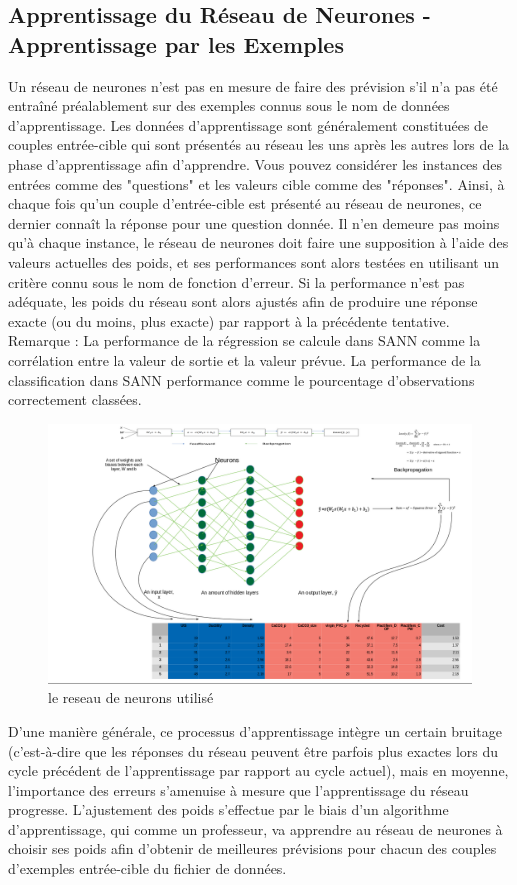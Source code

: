\documentclass[11pt]{report}
\begin{document}
\subsection{Apprentissage du Réseau de Neurones - Apprentissage par les Exemples}
Un réseau de neurones n'est pas en mesure de faire des prévision s'il n'a pas été entraîné préalablement sur des exemples connus sous le nom de données d'apprentissage. Les données d'apprentissage sont généralement constituées de couples entrée-cible qui sont présentés au réseau les uns après les autres lors de la phase d'apprentissage afin d'apprendre. Vous pouvez considérer les instances des entrées comme des "questions" et les valeurs cible comme des "réponses". Ainsi, à chaque fois qu'un couple d'entrée-cible est présenté au réseau de neurones, ce dernier connaît la réponse pour une question donnée. Il n'en demeure pas moins qu'à chaque instance, le réseau de neurones doit faire une supposition à l'aide des valeurs actuelles des poids, et ses performances sont alors testées en utilisant un critère connu sous le nom de fonction d'erreur. Si la performance n'est pas adéquate, les poids du réseau sont alors ajustés afin de produire une réponse exacte (ou du moins, plus exacte) par rapport à la précédente tentative.
\\
Remarque : La performance de la régression se calcule dans SANN comme la corrélation entre la valeur de sortie et la valeur prévue. La performance de la classification dans SANN performance comme le pourcentage d'observations correctement classées.

\begin{figure}[H]
	\begin{center}
		\includegraphics[width=12cm]{images/neural.png}
		\caption{le reseau de neurons utilisé}
		\label{fig:figure}
	\end{center}
\end{figure}
D'une manière générale, ce processus d'apprentissage intègre un certain bruitage (c'est-à-dire que les réponses du réseau peuvent être parfois plus exactes lors du cycle précédent de l'apprentissage par rapport au cycle actuel), mais en moyenne, l'importance des erreurs s'amenuise à mesure que l'apprentissage du réseau progresse. L'ajustement des poids s'effectue par le biais d'un algorithme d'apprentissage, qui comme un professeur, va apprendre au réseau de neurones à choisir ses poids afin d'obtenir de meilleures prévisions pour chacun des couples d'exemples entrée-cible du fichier de données.
\end{document}
